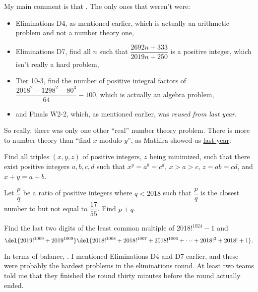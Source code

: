 \documentclass[11pt,paper=letter]{scrartcl}
\begin{document}
My main comment is that . The only ones that weren't were:
\begin{itemize}
  \item Eliminations D4, as mentioned earlier, which is actually an arithmetic problem and not a number theory one,
  \item Eliminations D7, find all $n$ such that $\dfrac{2692n + 333}{2019n + 250}$ is a positive integer, which isn't really a hard problem,
  \item Tier 10-3, find the number of positive integral factors of $\dfrac{2018^2 - 1298^2 - 80^3}{64} - 100$, which is actually an algebra problem,
  \item and Finals W2-2, which, as mentioned earlier, was \emph{reused from last year}.
\end{itemize}
So really, there was only one other ``real'' number theory problem. There is more to number theory than ``find $x$ modulo $y$'', as Mathira showed us \href{http://cjquines.com/files/mathira2018orals.pdf}{last year}:
\begin{probboxed}
   Find all triples $(x, y, z)$ of positive integers, $z$ being minimized, such that there exist positive integers $a, b, c, d$ such that $x^y = a^b = c^d$, $x > a > c$, $z = ab = cd$, and $x + y = a + b$.
\end{probboxed}
\vspace{-10pt}
\begin{probboxed}
   Let $\dfrac pq$ be a ratio of positive integers where $q < 2018$ such that $\dfrac pq$ is the closest number to but not equal to $\dfrac{17}{55}$. Find $p + q$.
\end{probboxed}
\vspace{-10pt}
\begin{probboxed}
   Find the last two digits of the least common multiple of $2018!^{1024} - 1$ and
  $$\del{2019!^{1009} + 2019^{1009}}\del{2018!^{1008} + 2018!^{1007} + 2018!^{1006} + \cdots + 2018!^2 + 2018! + 1}.$$
\end{probboxed}

In terms of balance, . I mentioned Eliminations D4 and D7 earlier, and these were probably the hardest problems in the eliminations round. At least two teams told me that they finished the round thirty minutes before the round actually ended.
\end{document}
